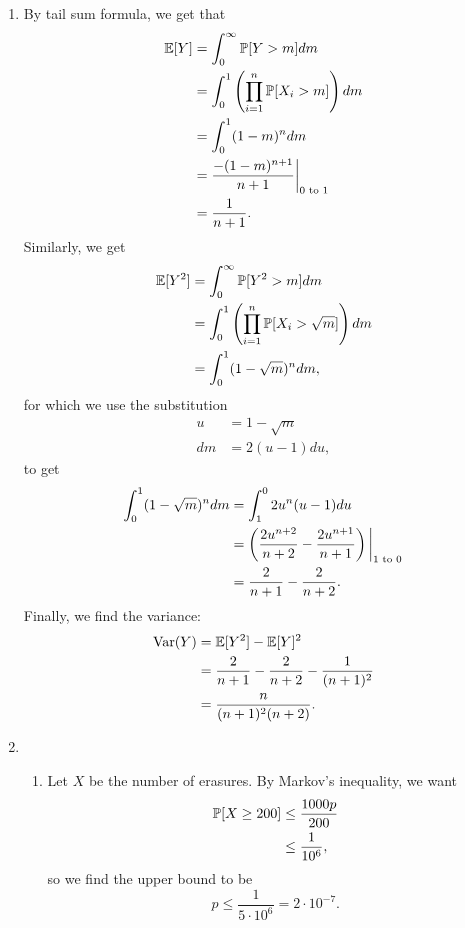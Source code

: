 \begin{enumerate}
    \item By tail sum formula, we get that
    \begin{align*}
        \E[Y] &= \int_0^\infty\P[Y > m]dm \\
            &= \int_0^1\left(\prod_{i = 1}^n\P[X_i > m]\right)dm \\
            &= \int_0^1(1 - m)^ndm \\
            &= \frac{-(1 - m)^{n + 1}}{n + 1}\bigg|_{0 \f{ to } 1} \\
            &= \frac{1}{n + 1}.
    \end{align*}
    Similarly, we get
    \begin{align*}
        \E[Y^2] &= \int_0^\infty\P[Y^2 > m]dm \\
            &= \int_0^1\left(\prod_{i = 1}^n\P[X_i > \sqrt{m}]\right)dm \\
            &= \int_0^1(1 - \sqrt{m})^ndm,
    \end{align*}
    for which we use the substitution
    \begin{align*}
        u &= 1 - \sqrt{m} \\
        dm &= 2(u - 1)du,
    \end{align*}
    to get
    \begin{align*}
        \int_0^1(1 - \sqrt{m})^ndm &= \int_1^0 2u^n(u - 1)du \\
            &= \left(\frac{2u^{n + 2}}{n + 2} - \frac{2u^{n + 1}}{n + 1}\right)\bigg|_{1 \f{ to } 0} \\
            &= \frac{2}{n + 1} - \frac{2}{n + 2}.
    \end{align*}
    Finally, we find the variance:
    \begin{align*}
        \f{Var}(Y) &= \E[Y^2] - \E[Y]^2 \\
            &= \frac{2}{n + 1} - \frac{2}{n + 2} - \frac{1}{(n + 1)^2} \\
            &= \frac{n}{(n + 1)^2(n + 2)}.
    \end{align*}
    
    \item \begin{enumerate}
        \item Let $X$ be the number of erasures. By Markov's inequality, we want
        \begin{align*}
            \P[X \geq 200] &\leq \frac{1000p}{200} \\
                &\leq \frac{1}{10^6},
        \end{align*}
        so we find the upper bound to be
        \[
            p \leq \frac{1}{5 \cdot 10^6} = 2 \cdot 10^{-7}.
        \]
        

\end{enumerate}
\end{enumerate}
